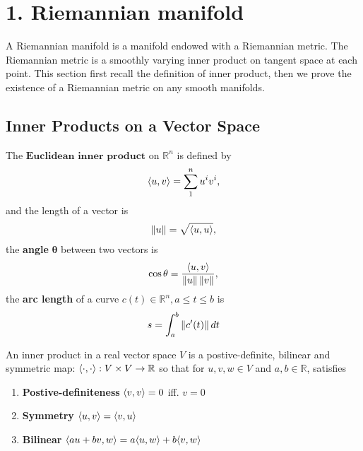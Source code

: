 
\section[Lecture 1--{Riemannian manifold}]{1. Riemannian manifold}
A Riemannian manifold is a manifold endowed with a Riemannian metric.
The Riemannian metric is a smoothly varying inner product on tangent space at each point.
This section first recall the definition of inner product, then we prove the existence
of a Riemannian metric on any smooth manifolds.
\subsection{Inner Products on a Vector Space}
The $\textbf{Euclidean inner product}$ on $\mathbb{R}^n$ is defined by
\begin{align}
    \langle u, v \rangle=\sum_{1}^{n}u^i v^i,
\end{align}
and the length of a vector is
\begin{align}
    \left\| u \right\|=\sqrt{\langle u, u \rangle},
\end{align}
the \textbf{angle} $\boldsymbol{\theta}$ between two vectors is
\begin{align}
    \cos \theta = \frac{\langle u, v \rangle}{\left\| u \right\|\left\| v \right\|},
\end{align}
the \textbf{arc length} of a curve $c(t) \in \mathbb{R}^n, a \leq t \leq b$ is 
\begin{align}
    s = \int_{a}^{b} \left\| c'(t) \right\| dt
\end{align}

\begin{definition}
    An inner product in a real vector space $V$ is a postive-definite,
    bilinear and symmetric map: $\langle \cdot, \cdot \rangle: 
    V \times V \rightarrow \mathbb{R}$ 
    so that for $u,v,w \in V$ and $a,b\in \mathbb{R}$, satisfies
    \begin{enumerate}[label= (\roman*)]
        \item \textbf{Postive-definiteness} $\langle v, v \rangle=0$ iff. $v=0$
        \item \textbf{Symmetry} $\langle u, v \rangle=\langle v, u \rangle$
        \item \textbf{Bilinear} $\langle au+bv, w \rangle=a\langle u, w \rangle+b\langle v, w \rangle$
    \end{enumerate}
\label{def. inner prodcut}
\end{definition}

